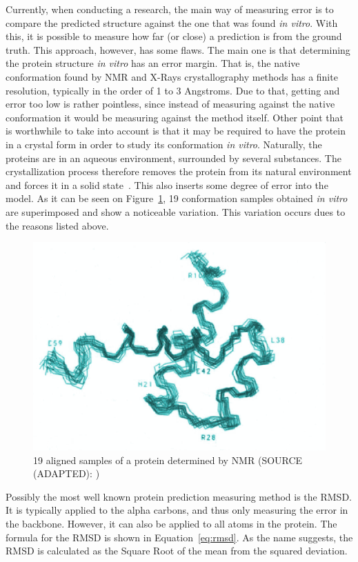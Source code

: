 Currently, when conducting a research, the main way of measuring error is to
compare the predicted structure against the one that was found \textit{in
vitro}. With this, it is possible to measure how far (or close) a prediction is
from the ground truth. This approach, however, has some flaws. The main one is
that determining the protein structure \textit{in vitro} has an error margin.
That is, the native conformation found by \ac{NMR} and X-Rays crystallography
methods has a finite resolution, typically in the order
of 1 to 3 Angstroms. Due to that, getting and error too low is rather
pointless, since instead of measuring against the native conformation
it would be measuring against the method itself. Other point that is
worthwhile to take into account is that it may be required to have the
protein in a crystal form in order to study its conformation
\textit{in vitro}. Naturally, the proteins are in an aqueous environment,
surrounded by several substances. The crystallization process therefore
removes the protein from its natural environment and forces it in a
solid state~\cite{wuthrich1989protein}.
This also inserts some degree of error into the model. As it can be seen
on Figure~\ref{fig:protein-error}, 19 conformation samples obtained
\textit{in vitro} are superimposed and show a noticeable variation.
This variation occurs dues to the reasons listed above.

\begin{figure}
    \centering
    \includegraphics[width=0.7\linewidth]{Figuras/protein-error.png}
    \caption{19 aligned samples of a protein determined by \ac{NMR} (SOURCE (ADAPTED): \cite{wuthrich1989protein})}
    \label{fig:protein-error}
\end{figure}

Possibly the most well known protein prediction measuring method is the
\ac{RMSD}. It is typically applied to the alpha carbons, and thus only
measuring the error in the backbone. However, it can also be applied to all
atoms in the protein. The formula for the \ac{RMSD} is shown in
Equation~\eqref{eq:rmsd}. As the name suggests, the \ac{RMSD} is calculated as
the Square Root of the mean from the squared deviation.

